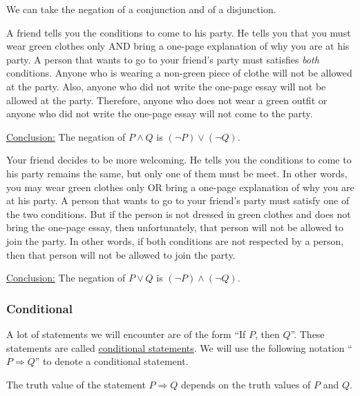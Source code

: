 We can take the negation of a conjunction and of a disjunction.

\begin{example}
A friend tells you the conditions to come to his party. He tells you that you must wear green clothes only AND bring a one-page explanation of why you are at his party. A person that wants to go to your friend's party must satisfies \textit{both} conditions. Anyone who is wearing a non-green piece of clothe will not be allowed at the party. Also, anyone who did not write the one-page essay will not be allowed at the party. Therefore, anyone who does not wear a green outfit or anyone who did not write the one-page essay will not come to the party. 
\end{example}

\underline{Conclusion:} The negation of $P \wedge Q$ is $(\neg P) \vee (\neg Q)$.

\begin{example}
Your friend decides to be more welcoming. He tells you the conditions to come to his party remains the same, but only one of them must be meet. In other words, you may wear green clothes only OR bring a one-page explanation of why you are at his party. A person that wants to go to your friend's party must satisfy one of the two conditions. But if the person is not dressed in green clothes and does not bring the one-page essay, then unfortunately, that person will not be allowed to join the party. In other words, if both conditions are not respected by a person, then that person will not be allowed to join the party.
\end{example}

\underline{Conclusion:} The negation of $P \vee Q$ is $(\neg P) \wedge (\neg Q)$.

\subsubsection*{Conditional}

A lot of statements we will encounter are of the form ``If $P$, then $Q$''. These statements are called \underline{conditional statements}. We will use the following notation ``$P \Rightarrow Q$'' to denote a conditional statement.

The truth value of the statement $P \Rightarrow Q$ depends on the truth values of $P$ and $Q$.

